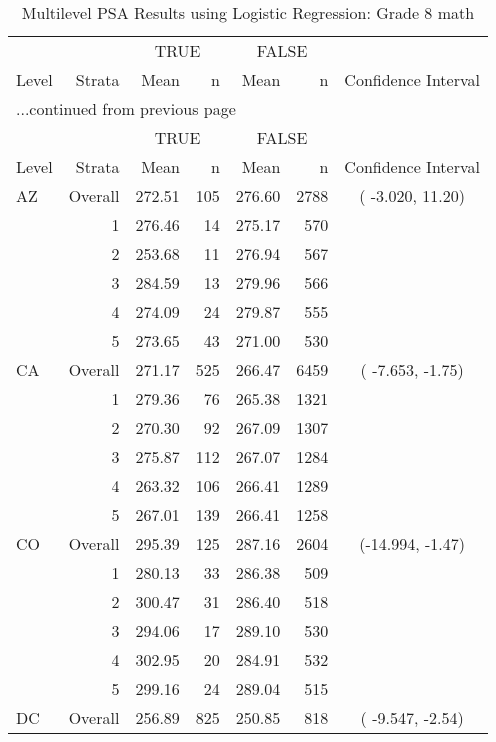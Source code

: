 \begin{longtable}{lrrr@{\extracolsep{.25cm}}rrc}
\caption{Multilevel PSA Results using Logistic Regression: Grade 8 math} \\ 
   \hline & & \multicolumn{2}{c}{TRUE} & \multicolumn{2}{c}{FALSE} & \\ \cline{3-4} \cline{5-6} Level & Strata & Mean & n & Mean & n & Confidence Interval \\ \hline\endfirsthead \multicolumn{7}{l}{{...continued from previous page}}\\ \hline  & & \multicolumn{2}{c}{TRUE} & \multicolumn{2}{c}{FALSE} & \\ \cline{3-4} \cline{5-6} Level & Strata & Mean & n & Mean & n & Confidence Interval \\ \hline \endhead \endfoot \endlastfoot  \hline
AZ & Overall & 272.51 & 105 & 276.60 & 2788 & ( -3.020,  11.20) \\ 
   & 1 & 276.46 &  14 & 275.17 & 570 &  \\ 
   & 2 & 253.68 &  11 & 276.94 & 567 &  \\ 
   & 3 & 284.59 &  13 & 279.96 & 566 &  \\ 
   & 4 & 274.09 &  24 & 279.87 & 555 &  \\ 
   & 5 & 273.65 &  43 & 271.00 & 530 &  \\ 
   \hline
CA & Overall & 271.17 & 525 & 266.47 & 6459 & ( -7.653,  -1.75) \\ 
   & 1 & 279.36 &  76 & 265.38 & 1321 &  \\ 
   & 2 & 270.30 &  92 & 267.09 & 1307 &  \\ 
   & 3 & 275.87 & 112 & 267.07 & 1284 &  \\ 
   & 4 & 263.32 & 106 & 266.41 & 1289 &  \\ 
   & 5 & 267.01 & 139 & 266.41 & 1258 &  \\ 
   \hline
CO & Overall & 295.39 & 125 & 287.16 & 2604 & (-14.994,  -1.47) \\ 
   & 1 & 280.13 &  33 & 286.38 & 509 &  \\ 
   & 2 & 300.47 &  31 & 286.40 & 518 &  \\ 
   & 3 & 294.06 &  17 & 289.10 & 530 &  \\ 
   & 4 & 302.95 &  20 & 284.91 & 532 &  \\ 
   & 5 & 299.16 &  24 & 289.04 & 515 &  \\ 
   \hline
DC & Overall & 256.89 & 825 & 250.85 & 818 & ( -9.547,  -2.54) \\ 

\end{longtable}
